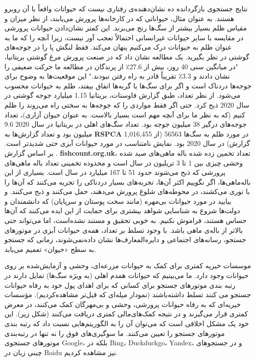 نتایج جستجوی بازگردانده ‌ده نشان‌دهنده‌ی رفتاری نیست که حیوانات واقعاً با آن روبرو هستند.
به عنوان مثال، حیواناتی که در کارخانه‌ها پرورش می‌یابند، از نظر میزان و مقیاس ظلم بسیار بیشتر از سگ‌ها رنج می‌برند.
این کمتر نشان‌دادن حیوانات پرورشی در مقایسه با سایر حیوانات غیرانسانی احتمالاً تعجب آور نیست، زیرا آنچه را که ما به عنوان ظلم به حیوانات درک می‌کنیم پنهان می‌کند.
فقط لنگش پا را در جوجه‌های گوشتی در نظر بگیرید.
یک مطالعه نشان داد که در صنعت پرورش مرغ گوشتی بریتانیا، "در میانگین سنی 40 روز، بیش از 27.6٪ از پرندگان در مطالعه ما حرکت ضعیفی را نشان دادند و 3.3٪ تقریباً قادر به راه رفتن نبودند." این موقعیت‌ها به وضوح برای جوجه‌ها دردناک است و اگر برای سگ‌ها یا گربه‌ها اتفاق بیفتد، ظلم به حیوانات محسوب می‌شود.
از نظر تعداد، طبق گزارش فاوستات، بریتانیا 1.15 میلیارد جوجه گوشتی در سال 2020 ذبح کرد.
حتی اگر فقط مواردی را که جوجه‌ها به سختی راه می‌روند را ظلم کنیم (که به نظر ما برای آنچه مهم است بسیار بالاست.
به عنوان حیوان آزاری)، تعداد جوجه‌های درگیر 38 میلیون جوجه بود.
تعداد سگ‌های اهلی در بریتانیا در سال 2020 9.6 میلیون بود و تعداد گزارش‌ها به \textenglish{\textbf{RSPCA}} در مورد ظلم به سگ‌ها 56563 (از 1,016,455 گزارش) در سال 2020 بود.
نمایش نامتناسب در مورد حیوانات آبزی حتی شدیدتر است.
. بر اساس گزارش \textenglish{\textbf{fishcount.org.uk}}، تعداد تخمین زده شده باله ماهی‌های صید شده وحشی چیزی بین 1 تا 3 تریلیون در سال است و محدوده تخمینی تعداد باله ماهی‌های پرورشی که ذبح می‌شوند حدود 51 تا 167 میلیارد در سال است.
بسیاری از این باله‌ماهی‌ها، اگر نگوییم اکثر آن‌ها، تجربه‌های بسیار دردناکی را تجربه می‌کنند که آن‌ها را با توری می‌کشند، در محوطه‌های شلوغ پرورش می‌دهند، حمل می‌کنند و ذبح می‌کنند.
و بیایید در مورد حیوانات بی‌مهره (مانند سخت پوستان و سرپایان) که دانشمندان و دولت‌ها شروع به شناسایی شواهد بیشتری برای حمایت از این ایده می‌کنند که آن‌ها حساس هستند، فراموش نکنیم.
به خوبی تحقیق و مستند نشده‌است، اما می‌تواند حتی بالاتر از باله‌ی ماهی باشد.
با وجود تسلط بر تعداد، همه‌ی حیوانات آبزی در موتورهای جستجو، رسانه‌های اجتماعی و دایره‌المعارف‌ها نشان داده‌نمی‌شوند، زمانی که جستجو به سطح «حیوان» تعمیم می‌یابد.

موسسات خیریه کمتری برای کمک به حیوانات مزرعه‌‌ای، وحشی و آزمایش‌شده بر روی حیوانات وجود دارد.
ما می‌بینیم که حیوانات همدم اهلی (به ویژه سگ‌ها) تمایل دارند در رتبه بندی موتورهای جستجو برای کسانی که برای اهدای پول خود به رفاه حیوانات جستجو می کنند تسلط داشته‌باشند (نمودار میله‌ای که قبل‌تر مشاهده‌کردیم).
مؤسسات خیریه‌ای که به رفاه حیوانات پرورشی، وحشی و بی‌مهرگان کمک می‌کنند، در معرض کمتری قرار می‌گیرند و در نتیجه کمک‌های‌مالی کمتری دریافت می‌کنند (شکل زیر).
این خود یک مشکل اخلاقی است که می‌توان آن را به الگوریتم‌هایی نسبت داد که رتبه بندی موتورهای جستجو را تعیین می‌کنند.
ما سوگیری‌های فوق را نه تنها در رتبه‌بندی موتورهای جستجوی Google، بلکه در Bing، Duckduckgo، Yandex، و در جستجوهای چینی زبان در Baidu نیز مشاهده کردیم.


